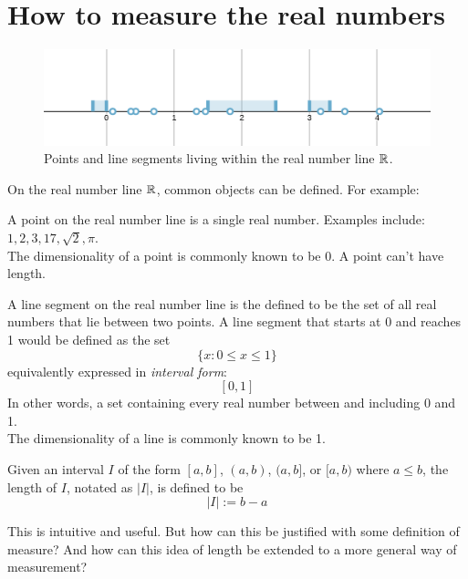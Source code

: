\documentclass[11pt]{ekblite}
\begin{document}
\newpage
\section{How to measure the real numbers}
\begin{figure}[h]
	\includegraphics[scale=0.3]{img/c10.jpg}
	\caption{Points and line segments living within the real number line $\mathbb{R}$.}
\end{figure}
On the real number line $\mathbb{R}$, common objects can be defined. For example:
\begin{example}[Point]
	A point on the real number line is a single real number. Examples include: $1,2,3,17,\sqrt{2},\pi$.
	\\[0.2in]The dimensionality of a point is commonly known to be 0. A point can't have length.
\end{example}
\begin{example}
	A line segment on the real number line is the defined to be the set of all real numbers that lie between two points. A line segment that starts at 0 and reaches 1 would be defined as the set
	\[\{x : 0 \le x \le 1\}\] 
	equivalently expressed in \textit{interval form}:
	\[[0,1]\]
	In other words, a set containing every real number between and including 0 and 1.
	\\[0.2in]The dimensionality of a line is commonly known to be 1. 
\end{example}

\begin{definition}
	Given an interval $I$ of the form $[a,b]$, $(a,b)$, $(a,b]$, or $[a,b)$ where $a \le b$, the length of $I$, notated as $|I|$, is defined to be
	\[|I| := b - a\]
\end{definition}
This is intuitive and useful. But how can this be justified with some definition of measure? And how can this idea of length be extended to a more general way of measurement? 
\end{document}
